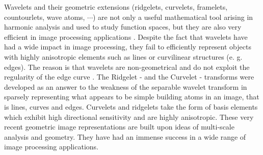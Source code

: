 \documentclass{UCF_ETD}
\begin{document}
Wavelets and their geometric extensions (ridgelets, curvelets, framelets, countourlets, wave atoms, $\cdots$) are not only a useful mathematical tool arising in harmonic analysis and used to study function spaces, but they are also very efficient in image processing applications \cite{Gilles2014}. Despite the fact that wavelets have had a wide impact in image processing, they fail to efficiently represent objects with highly anisotropic elements such as lines or curvilinear structures (e. g. edges). The reason is that wavelets are non-geometrical and do not exploit the regularity of the edge curve \cite{Fadili2012}. The Ridgelet \cite{Candes1998}-\cite{Donoho2003} and the Curvelet \cite{Candes2004}-\cite{Jian2010} transforms were developed as an answer to the weakness of the separable wavelet transform in sparsely representing what appears to be simple building atoms in an image, that is lines, curves and edges. Curvelets and ridgelets take the form of basis elements which exhibit high directional sensitivity and are highly anisotropic. These very recent geometric image representations are built upon ideas of multi-scale analysis and geometry. They have had an immense success in a wide range of image processing applications.
\end{document}
